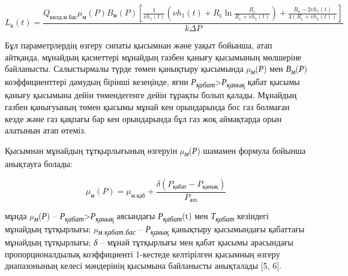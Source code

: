 \begin{equation}
    L_{\text{к}}(t) = \frac{Q_{\text{көлд.м.бас}} \mu_{\text{м}}(P) B_{\text{м}}(P) \left[ \frac{1}{v h_1(t)} \left( \nu h_1(t) + R_{\text{с}} \ln \frac{R_{\text{с}}}{R_{\text{с}} + v h_1(t)} \right) + \frac{R_{\text{к}} - 2v h_1(t)}{4 (R_{\text{с}} + v h_1(t))} \right]}{k \Delta P}
    \end{equation}
    \begin{multicols}{2}
    
Бұл параметрлердің өзгеру сипаты қысымнан және уақыт бойынша, атап
айтқанда, мұнайдың қасиеттері мұнайдың газбен қанығу қысымының мөлшеріне
байланысты. Салыстырмалы түрде төмен қанықтыру қысымында
\emph{µ\textsubscript{м}}(\emph{Р}) мен
\emph{В\textsubscript{м}}(\emph{Р}) коэффициенттері дамудың бірінші
кезеңінде, яғни
\emph{Р\textsubscript{қабат}}\textgreater{}\emph{Р\textsubscript{қанық}}
қабат қысымы қанығу қысымына дейін төмендегенге дейін тұрақты болып
қалады. Мұнайдың газбен қанығуының төмен қысымы мұнай кен орындарында
бос газ болмаған кезде және газ қақпағы бар кен орындарында бұл газ жоқ
аймақтарда орын алатынын атап өтеміз.

Қысымнан мұнайдың тұтқырлығының өзгеруін
\emph{µ\textsubscript{м}}(\emph{Р}) шамамен формула бойынша анықтауға
болады:

\begin{equation}
    \mu_{\text{м}}(P) = \mu_{\text{м.қаб}} + \frac{\delta(P_{\text{қабат}} - P_{\text{қанық}})}{P_{\text{аm}}}
    \end{equation}
  

мұнда \emph{µ\textsubscript{м}}(\emph{Р}) --
\emph{Р\textsubscript{қабат}}\textgreater{}\emph{Р\textsubscript{қанық}}
аясындағы \emph{Р\textsubscript{қабат}}(t) мен
\emph{Т\textsubscript{қабат}} кезіндегі мұнайдың тұтқырлығы;
\emph{µ\textsubscript{м.қабат.бас }}-- \emph{Р\textsubscript{қанық}}
қанықтыру қысымындағы қабаттағы мұнайдың тұтқырлығы; \emph{δ} -- мұнай
тұтқырлығы мен қабат қысымы арасындағы пропорционалдылық коэффициенті
1-кестеде келтірілген қысымның өзгеру диапазонының келесі мәндерінің
қысымына байланысты анықталады {[}5, 6{]}.

\end{multicols} 

